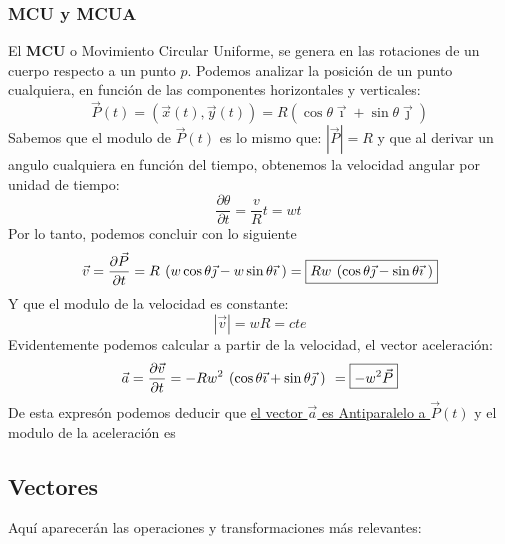 \subsubsection{MCU y MCUA}
 \par
El \textbf{MCU} o Movimiento Circular Uniforme, se genera en las rotaciones de un cuerpo respecto a un punto \(p\).
Podemos analizar la posición de un punto cualquiera, en función de las componentes horizontales y verticales:
\[
        \boxed{\vec{P}(t)=(\vec{x}(t),\vec{y}(t))=R(\cos{\theta}\vec{\imath} + \sin{\theta}\vec{\jmath})}
\]
Sabemos que el modulo de \(\vec{P}(t)\) es lo mismo que: \(\left | \vec{P} \right | = R\) y que al derivar un angulo cualquiera en función del tiempo, obtenemos la velocidad angular por unidad de tiempo: \[
        \frac{\partial \theta}{\partial t} = \frac{v}{R}t = wt\
\]
Por lo tanto, podemos concluir con lo siguiente
\[
        \vec{v} =\frac{\partial \vec{P}}{\partial t} =R \hspace{1.35mm} (w\cos{\theta}\vec{\jmath} - w\sin{\theta}\vec{\imath}\hspace{1mm})  = \boxed{Rw \hspace{1.35mm} (\cos{\theta}\vec{\jmath} - \sin{\theta}\vec{\imath}\hspace{1mm})}
\]
Y que el modulo de la velocidad es constante:
\[
        \left | \vec{v} \right | = wR = cte
\]
Evidentemente podemos calcular a partir de la velocidad, el vector aceleración:
\[
        \vec{a} =\frac{\partial \vec{v}}{\partial t} = -Rw^2 \hspace{1.35mm}(\cos{\theta}\vec{\imath} + \sin{\theta}\vec{\jmath}\hspace{1mm}) \hspace{1.35mm}= \boxed{-w^{2}\vec{P}}
\]
De esta expresón podemos deducir que \underline{el vector \(\vec{a}\) es Antiparalelo a \(\vec{P}(t)\)} y el modulo de la aceleración es 
\subsection{Vectores}

Aquí aparecerán las operaciones y transformaciones más relevantes: \par
\hspace{0.5cm}
